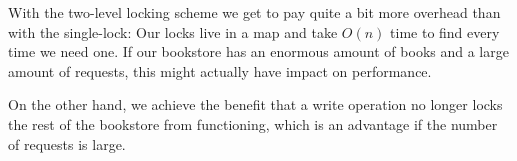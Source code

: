 \documentclass[11pt]{article}
\begin{document}
\begin{enumerate}
    With the two-level locking scheme we get to pay quite a bit more overhead
    than with the single-lock: Our locks live in a map and take $O(n)$ time to
    find every time we need one. If our bookstore has an enormous amount of
    books and a large amount of requests, this might actually have impact on
    performance.

    On the other hand, we achieve the benefit that a write operation no longer
    locks the rest of the bookstore from functioning, which is an advantage if
    the number of requests is large.

\end{enumerate}
\end{document}
